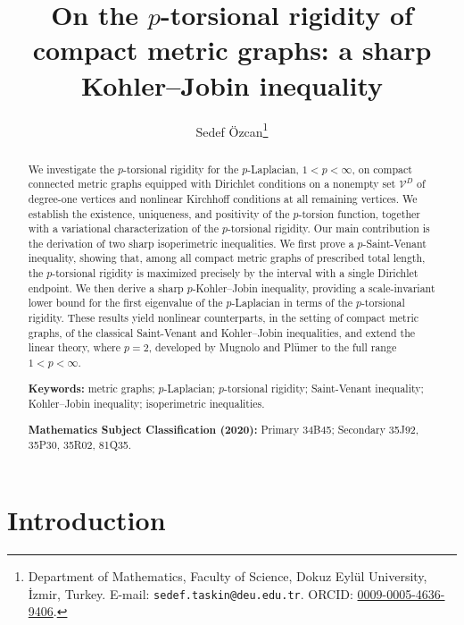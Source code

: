 \documentclass[12pt,a4paper]{article}
\title{On the \texorpdfstring{$p$}{p}-torsional rigidity of compact metric
	graphs: a sharp Kohler--Jobin inequality}
\author{Sedef \"Ozcan\thanks{%
		Department of Mathematics, Faculty of Science, Dokuz Eyl\"ul University,
		\.Izmir, Turkey. E-mail: \texttt{sedef.taskin@deu.edu.tr}.
		ORCID: \href{https://orcid.org/0009-0005-4636-9406}{0009-0005-4636-9406}.}}
\date{}
\numberwithin{equation}{section}
\begin{document}
	
	\maketitle
\begin{abstract}
	We investigate the $p$-torsional rigidity for the $p$-Laplacian,
	$1<p<\infty$, on compact connected metric graphs equipped with Dirichlet
	conditions on a nonempty set $\mathcal{V}^D$ of degree-one vertices and
nonlinear Kirchhoff conditions at all remaining vertices. We
	establish the existence, uniqueness, and positivity of the 
	$p$-torsion function, together with a variational characterization of the
	$p$-torsional rigidity. Our main contribution is the derivation of two
	sharp isoperimetric inequalities. We first prove a $p$-Saint-Venant
	inequality, showing that, among all compact metric graphs of prescribed
	total length, the $p$-torsional rigidity is maximized precisely by the
	interval with a single Dirichlet endpoint. We then derive a sharp
	$p$-Kohler--Jobin inequality, providing a scale-invariant lower bound for
	the first eigenvalue of the $p$-Laplacian in terms of the $p$-torsional
	rigidity. These results yield nonlinear counterparts, in the setting of
	compact metric graphs, of the classical Saint-Venant and Kohler--Jobin
	inequalities, and extend the linear theory, where $p=2$, developed by Mugnolo
	and Pl\"umer to the full range $1<p<\infty$.
	
	\medskip
	\noindent\textbf{Keywords:} metric graphs; $p$-Laplacian; $p$-torsional
	rigidity; Saint-Venant inequality; Kohler--Jobin inequality;
	isoperimetric inequalities.
	
	\smallskip
	\noindent\textbf{Mathematics Subject Classification (2020):}
	Primary 34B45; Secondary 35J92, 35P30, 35R02, 81Q35.
\end{abstract}

\section{Introduction}
\end{document}
